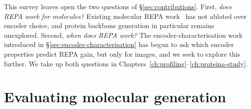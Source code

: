 \documentclass[12pt,a4paper,twoside]{report}
\begin{document}
This survey leaves open the two questions of \S\ref{sec:contributions}. First, \emph{does REPA work for molecules?} Existing molecular REPA work~\cite{REED,BoltzREPA} has not ablated over encoder choice, and protein backbone generation in particular remains unexplored. Second, \emph{when does REPA work?} The encoder-characterisation work introduced in \S\ref{sec:encoder-characterisation} has begun to ask which encoder properties predict REPA gain, but only for images, and we seek to explore this further. We take up both questions in Chapters~\ref{ch:profiling}--\ref{ch:proteina-study}.

\chapter{Evaluating molecular generation}
\label{ch:evaluation}
\end{document}
